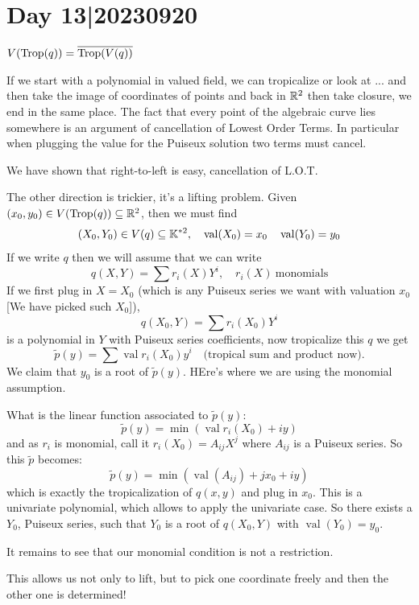 \documentclass[12pt]{memoir}
\DeclareMathOperator{\val}{val}
\DeclareMathOperator{\Trop}{Trop}
\theoremstyle{definition}
\begin{document}
\section{Day 13|20230920}

\begin{Th}
$V(\Trop(q))=\ov{\Trop(V(q))}$
\end{Th}

If we start with a polynomial in valued field, we can tropicalize or look at ... and then take the image of coordinates of points and back in $\mathbb{R}^2$ then take closure, we end in the same place. The fact that every point of the algebraic curve  lies somewhere is an argument of cancellation of Lowest Order Terms. In particular when plugging the value for the Puiseux solution two terms must cancel. 
\begin{ptcbp}
We have shown that right-to-left is easy, cancellation of L.O.T.\par 
The other direction is trickier, it's a lifting problem. Given $(x_0,y_0)\in V(\Trop(q))\subseteq\bR^2$, then we must find 
$$(X_0,Y_0)\in V(q)\subseteq \bK^{\ast2},\quad\val(X_0)=x_0\quad\val(Y_0)=y_0$$
If we write $q$ then we will assume that we can write 
$$q(X,Y)=\sum r_i(X)Y^i,\quad r_i(X)\ \text{monomials}$$
If we first plug in $X=X_0$ (which is any Puiseux series we want with valuation $x_0$ [We have picked such $X_0$]), 
$$q(X_0,Y)=\sum r_i(X_0)Y^i$$
is a polynomial in $Y$ with Puiseux series coefficients, now tropicalize this $q$ we get 
$$\tilde{p}(y)=\sum\val r_i(X_0)y^i\quad\text{(tropical sum and product now)}.$$
We claim that $y_0$ is a root of $\tilde{p}(y)$. HEre's where we are using the monomial assumption.\par 
What is the linear function associated to $\tilde{p}(y)$:
$$\tilde{p}(y)=\min(\val r_i(X_0)+iy)$$
and as $r_i$ is monomial, call it $r_i(X_0)=A_{ij}X^j$ where $A_{ij}$ is a Puiseux series. So this $\tilde{p}$ becomes:
$$\tilde{p}(y)=\min(\val(A_{ij})+jx_0+iy)$$
which is exactly the tropicalization of $q(x,y)$ and plug in $x_0$. This is a univariate polynomial, which allows to apply the univariate case. So there exists a $Y_0$, Puiseux series, such that $Y_0$ is a root of $q(X_0,Y)$ with $\val(Y_0)=y_0$.\par 
It remains to see that our monomial condition is not a restriction. 
\end{ptcbp}

This allows us not only to lift, but to pick one coordinate freely and then the other one is determined!
\end{document}
